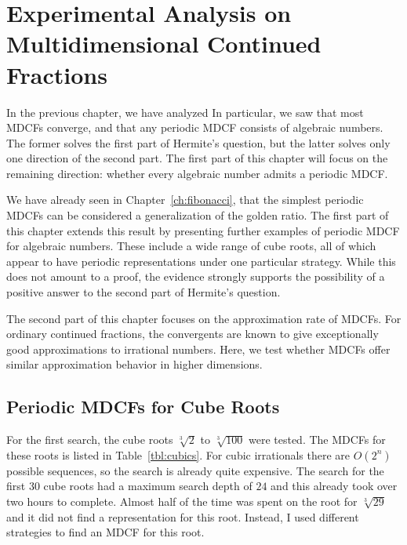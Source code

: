 \chapter{Experimental Analysis on Multidimensional Continued Fractions}
\label{ch:implementation}

In the previous chapter, we have analyzed
In particular, we saw that most MDCFs converge,
and that any periodic MDCF consists of algebraic numbers.
The former solves the first part of Hermite's question, but the latter solves
only one direction of the second part.
The first part of this chapter will focus on the remaining direction:
whether every algebraic number admits a periodic MDCF.

We have already seen in Chapter~\ref{ch:fibonacci},
that the simplest periodic MDCFs can be considered a generalization of the
golden ratio.
The first part of this chapter extends this result by presenting further
examples of periodic MDCF for algebraic numbers.
These include a wide range of cube roots,
all of which appear to have periodic representations under one particular strategy.
While this does not amount to a proof, the evidence strongly supports
the possibility of a positive answer to the second part of Hermite’s question.

The second part of this chapter focuses on the approximation rate of MDCFs.
For ordinary continued fractions, the convergents are known to give
exceptionally good approximations to irrational numbers.
Here, we test whether MDCFs offer similar approximation behavior in higher dimensions.

\iffalse
\section{Periodic MDCFs for Cube Roots}

For the first search, the cube roots $\sqrt[3]{2}$ to $\sqrt[3]{100}$ were tested.
The MDCFs for these roots is listed in Table~\ref{tbl:cubics}.
For cubic irrationals there are $O(2^n)$ possible sequences,
so the search is already quite expensive.
The search for the first 30 cube roots had a maximum search depth of $24$ and
this already took over two hours to complete.
Almost half of the time was spent on the root for $\sqrt[3]{29}$
and it did not find a representation for this root.
Instead, I used different strategies to find an MDCF for this root.

